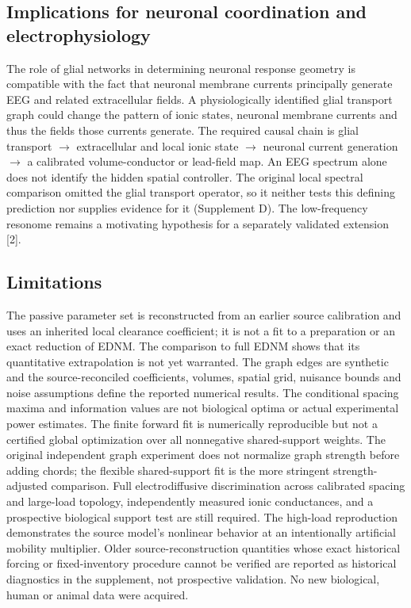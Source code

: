 \documentclass[
  11pt,
]{article}
\begin{document}
\subsection{Implications for neuronal coordination and
electrophysiology}\label{implications-for-neuronal-coordination-and-electrophysiology}

The role of glial networks in determining neuronal response geometry is
compatible with the fact that neuronal membrane currents principally
generate EEG and related extracellular fields. A physiologically
identified glial transport graph could change the pattern of ionic
states, neuronal membrane currents and thus the fields those currents
generate. The required causal chain is glial transport \(\to\)
extracellular and local ionic state \(\to\) neuronal current generation
\(\to\) a calibrated volume-conductor or lead-field map. An EEG spectrum
alone does not identify the hidden spatial controller. The original
local spectral comparison omitted the glial transport operator, so it
neither tests this defining prediction nor supplies evidence for it
(Supplement D). The low-frequency resonome remains a motivating
hypothesis for a separately validated extension {[}2{]}.

\subsection{Limitations}\label{limitations}

The passive parameter set is reconstructed from an earlier source
calibration and uses an inherited local clearance coefficient; it is not
a fit to a preparation or an exact reduction of EDNM. The comparison to
full EDNM shows that its quantitative extrapolation is not yet
warranted. The graph edges are synthetic and the source-reconciled
coefficients, volumes, spatial grid, nuisance bounds and noise
assumptions define the reported numerical results. The conditional
spacing maxima and information values are not biological optima or
actual experimental power estimates. The finite forward fit is
numerically reproducible but not a certified global optimization over
all nonnegative shared-support weights. The original independent graph
experiment does not normalize graph strength before adding chords; the
flexible shared-support fit is the more stringent strength-adjusted
comparison. Full electrodiffusive discrimination across calibrated
spacing and large-load topology, independently measured ionic
conductances, and a prospective biological support test are still
required. The high-load reproduction demonstrates the source model's
nonlinear behavior at an intentionally artificial mobility multiplier.
Older source-reconstruction quantities whose exact historical forcing or
fixed-inventory procedure cannot be verified are reported as historical
diagnostics in the supplement, not prospective validation. No new
biological, human or animal data were acquired.
\end{document}
